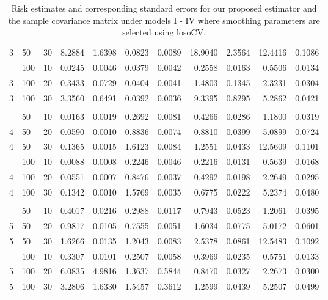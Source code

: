 \documentclass[12pt]{article}
\theoremstyle{definition}
\begin{document}
\begin{table}[H]
\begin{tabular}{lllrrrrrrrr}
  3 & 50 & 30 & 8.2884 & 1.6398 & 0.0823 & 0.0089 & 18.9040 & 2.3564 & 12.4416 & 0.1086 \\ 
      \hdashline
  3 & 100 & 10 & 0.0245 & 0.0046 & 0.0379 & 0.0042 & 0.2558 & 0.0163 & 0.5506 & 0.0134 \\ 
  3 & 100 & 20 & 0.3433 & 0.0729 & 0.0404 & 0.0041 & 1.4803 & 0.1345 & 2.3231 & 0.0304 \\ 
  3 & 100 & 30 & 3.3560 & 0.6491 & 0.0392 & 0.0036 & 9.3395 & 0.8295 & 5.2862 & 0.0421 \\ 
         \hdashline \\
      \hdashline
  4 & 50 & 10 & 0.0163 & 0.0019 & 0.2692 & 0.0081 & 0.4266 & 0.0286 & 1.1800 & 0.0319 \\ 
  4 & 50 & 20 & 0.0590 & 0.0010 & 0.8836 & 0.0074 & 0.8810 & 0.0399 & 5.0899 & 0.0724 \\ 
  4 & 50 & 30 & 0.1365 & 0.0015 & 1.6123 & 0.0084 & 1.2551 & 0.0433 & 12.5609 & 0.1101 \\ 
      \hdashline
  4 & 100 & 10 & 0.0088 & 0.0008 & 0.2246 & 0.0046 & 0.2216 & 0.0131 & 0.5639 & 0.0168 \\ 
  4 & 100 & 20 & 0.0551 & 0.0007 & 0.8476 & 0.0037 & 0.4292 & 0.0198 & 2.2649 & 0.0295 \\ 
  4 & 100 & 30 & 0.1342 & 0.0010 & 1.5769 & 0.0035 & 0.6775 & 0.0222 & 5.2374 & 0.0480 \\ 
        \hdashline \\
      \hdashline
 5 & 50 & 10 & 0.4017 & 0.0216 & 0.2988 & 0.0117 & 0.7943 & 0.0523 & 1.2061 & 0.0395 \\ 
  5 & 50 & 20 & 0.9817 & 0.0105 & 0.7555 & 0.0051 & 1.6034 & 0.0775 & 5.0172 & 0.0601 \\ 
  5 & 50 & 30 & 1.6266 & 0.0135 & 1.2043 & 0.0083 & 2.5378 & 0.0861 & 12.5483 & 0.1092 \\ 
      \hdashline
  5 & 100 & 10 & 0.3307 & 0.0101 & 0.2507 & 0.0058 & 0.3969 & 0.0235 & 0.5751 & 0.0133 \\ 
  5 & 100 & 20 & 6.0835 & 4.9816 & 1.3637 & 0.5844 & 0.8470 & 0.0327 & 2.2673 & 0.0300 \\ 
  5 & 100 & 30 & 3.2806 & 1.6330 & 1.5457 & 0.3612 & 1.2599 & 0.0439 & 5.2507 & 0.0499 \\ 
   \hline
\end{tabular}
\caption{Risk estimates and corresponding standard errors for our proposed estimator and the sample covariance matrix under models I - IV where smoothing parameters are selected using losoCV.} 
\end{table}
\end{document}
